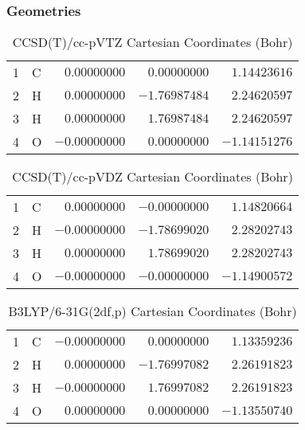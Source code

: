 \documentclass[10pt,oneside]{article}
\begin{document}
\clearpage

\subsection{\ \ \ }

\subsubsection*{Geometries}
\begin{table}[h!]
\centering
\caption{CCSD(T)/cc-pVTZ Cartesian Coordinates (Bohr)}
\begin{tabular}{llrrr}
1  & C  & $ 0.00000000$ & $ 0.00000000$ & $ 1.14423616$ \\
2  & H  & $ 0.00000000$ & $-1.76987484$ & $ 2.24620597$ \\
3  & H  & $ 0.00000000$ & $ 1.76987484$ & $ 2.24620597$ \\
4  & O  & $-0.00000000$ & $ 0.00000000$ & $-1.14151276$ \\
\end{tabular}
\end{table}

\begin{table}[h!]
\centering
\caption{CCSD(T)/cc-pVDZ Cartesian Coordinates (Bohr)}
\begin{tabular}{llrrr}
1  & C  & $ 0.00000000$ & $-0.00000000$ & $ 1.14820664$ \\
2  & H  & $-0.00000000$ & $-1.78699020$ & $ 2.28202743$ \\
3  & H  & $ 0.00000000$ & $ 1.78699020$ & $ 2.28202743$ \\
4  & O  & $-0.00000000$ & $-0.00000000$ & $-1.14900572$ \\
\end{tabular}
\end{table}

\begin{table}[h!]
\centering
\caption{B3LYP/6-31G(2df,p) Cartesian Coordinates (Bohr)}
\begin{tabular}{llrrr}
1  & C  & $-0.00000000$ & $ 0.00000000$ & $ 1.13359236$ \\
2  & H  & $ 0.00000000$ & $-1.76997082$ & $ 2.26191823$ \\
3  & H  & $-0.00000000$ & $ 1.76997082$ & $ 2.26191823$ \\
4  & O  & $ 0.00000000$ & $ 0.00000000$ & $-1.13550740$ \\
\end{tabular}
\end{table}
\end{document}
